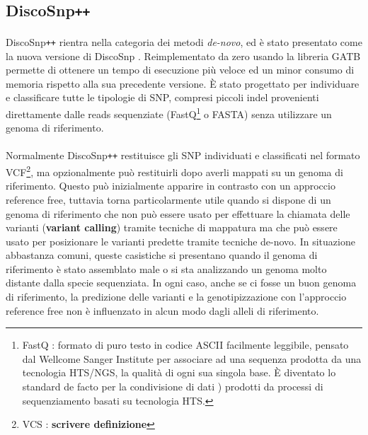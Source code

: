 \documentclass[../main.tex]{subfiles}
\begin{document}
\subsection{DiscoSnp\texttt{++}}
\paragraph{}
DiscoSnp\texttt{++} \cite{peterlongo2017discosnp++} rientra nella categoria dei metodi \textit{de-novo}, ed è stato presentato come la nuova versione di DiscoSnp \cite{uricaru2015reference}. Reimplementato da zero usando la libreria GATB \cite{drezen2014gatb} permette di ottenere un tempo di esecuzione più veloce ed un minor consumo di memoria rispetto alla sua precedente versione. È stato progettato per individuare e classificare tutte le tipologie di SNP, compresi piccoli indel provenienti direttamente dalle reads sequenziate (FastQ\footnote{FastQ :  formato di puro testo in codice ASCII facilmente leggibile, pensato dal Wellcome Sanger Institute per associare ad una sequenza prodotta da una tecnologia HTS/NGS, la qualità di ogni sua singola base. È diventato lo standard de facto per la condivisione di dati \cite{cock2010sanger}) prodotti da processi di sequenziamento basati su tecnologia HTS. } o FASTA) senza utilizzare un genoma di riferimento.

\paragraph{}  Normalmente DiscoSnp\texttt{++} restituisce gli SNP individuati e classificati nel formato VCF\footnote{VCS : \textbf{scrivere definizione}}, ma opzionalmente può restituirli dopo averli mappati su un genoma di riferimento. Questo può inizialmente apparire in contrasto con un approccio reference free, tuttavia torna particolarmente utile quando si dispone di un genoma di riferimento che non può essere usato per effettuare la chiamata delle varianti (\textbf{variant calling}) tramite tecniche di mappatura ma che può essere usato per posizionare le varianti predette tramite tecniche de-novo. In situazione abbastanza comuni, queste casistiche si presentano quando il genoma di riferimento è stato assemblato male o si sta analizzando un genoma molto distante dalla specie sequenziata. In ogni caso, anche se ci fosse un buon genoma di riferimento, la predizione delle varianti e la genotipizzazione con l'approccio reference free non è influenzato in alcun modo dagli alleli di riferimento.
\end{document}

